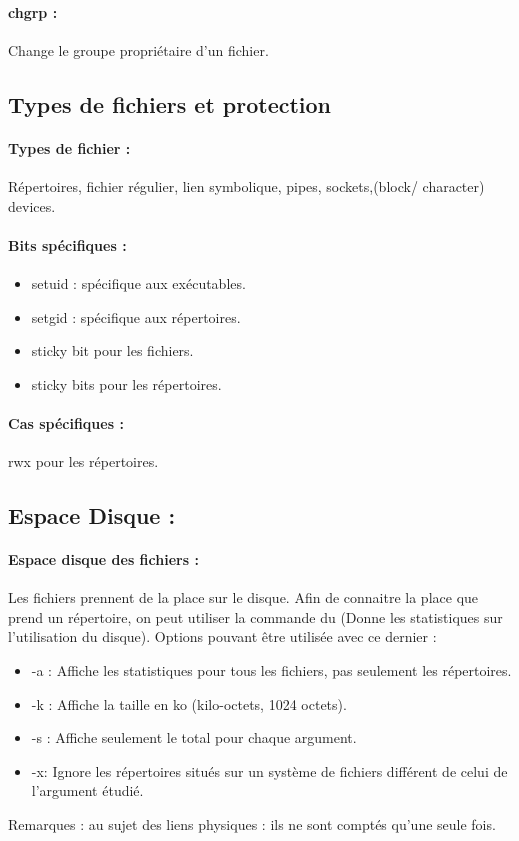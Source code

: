 \documentclass{article}[12pt]
\begin{document}
\paragraph{chgrp : }  Change le groupe propriétaire d'un fichier. 
\subsection{Types de fichiers et protection}
\paragraph{Types de fichier : } Répertoires, fichier régulier, lien symbolique, pipes, sockets,(block/ character) devices.
\paragraph{Bits spécifiques : }
\begin{itemize}
\item setuid : spécifique aux exécutables.
\item setgid : spécifique aux répertoires.
\item sticky bit pour les fichiers.
\item sticky bits pour les répertoires.
\end{itemize}
\paragraph{Cas spécifiques : } rwx pour les répertoires.
\subsection{ Espace Disque : }
\paragraph{Espace disque des fichiers : } Les fichiers prennent de la place sur le disque. Afin de connaitre la place que prend un répertoire, on peut utiliser la commande du (Donne les statistiques sur l'utilisation du disque). Options pouvant être utilisée avec ce dernier :
\begin{itemize}
\item -a : Affiche les statistiques pour tous les fichiers, pas seulement les répertoires.
\item -k : Affiche la taille en ko (kilo-octets, 1024 octets).
\item -s : Affiche seulement le total pour chaque argument.
\item -x: Ignore les répertoires situés sur un système de fichiers différent de celui de l'argument étudié.
\end{itemize}
Remarques : au sujet des liens physiques : ils ne sont comptés qu'une seule fois.
\end{document}
